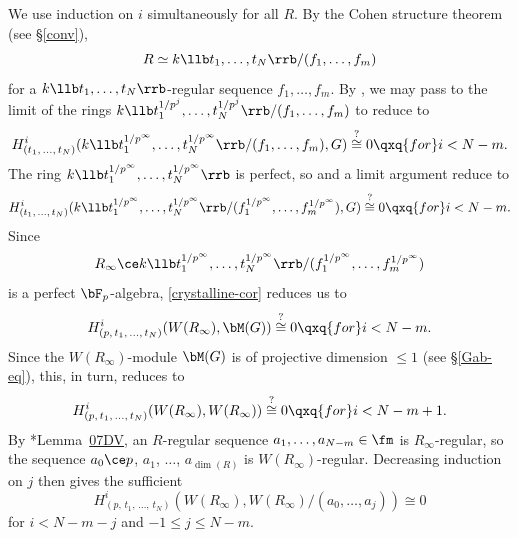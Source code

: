 \bpf
We use induction on $i$ simultaneously for all $R$. By the Cohen structure theorem (see \S\ref{conv}),
\[
R \simeq k\llb t_1, \dotsc, t_N \rrb/(f_1, \dotsc, f_m)
\]
for a $k\llb t_1, \dotsc, t_N \rrb$-regular sequence $f_1, \dotsc, f_m$. By , %
we may pass to the limit of the rings $k\llb t_1^{1/p^j}, \dotsc, t_N^{1/p^j} \rrb/(f_1, \dotsc, f_m)$ %
to reduce to
\[
H^i_{(t_1,\, \dotsc,\, t_N)}(k\llb t_1^{1/p^{\infty}}, \dotsc, t_N^{1/p^{\infty}} \rrb/(f_1, \dotsc, f_m), G) \overset{?}{\cong} 0 \qxq{for} i < N - m.
\]
The ring $k\llb t_1^{1/p^\infty}, \dotsc, t_N^{1/p^\infty} \rrb$ is perfect, so %
 and a limit argument reduce to
\[%
\source{purity-flat-cohomology}
H^i_{(t_1,\, \dotsc,\, t_N)}(k\llb t_1^{1/p^{\infty}}, \dotsc, t_N^{1/p^{\infty}} \rrb/(f_1^{1/p^{\infty}}, \dotsc, f_m^{1/p^{\infty}}), G) \overset{?}{\cong} 0 \qxq{for} i < N - m.
\]%
Since
\[
R_\infty \ce k\llb t_1^{1/p^{\infty}}, \dotsc, t_N^{1/p^{\infty}} \rrb/(f_1^{1/p^{\infty}}, \dotsc, f_m^{1/p^{\infty}})
\]
is a perfect $\bF_p$-algebra, \eqref{crystalline-cor} reduces us to
\[
H^i_{(p,\, t_1,\, \dotsc,\, t_N)}(W(R_\infty), \bM(G)) \overset{?}{\cong} 0 \qxq{for} i < N - m.
\]
Since the $W(R_\infty)$-module $\bM(G)$ is of projective dimension $\le 1$ (see \S\ref{Gab-eq}), this, in turn, reduces to
\[
H^i_{(p,\, t_1,\, \dotsc,\, t_N)}(W(R_\infty), W(R_\infty)) \overset{?}{\cong} 0 \qxq{for} i < N - m + 1. %
\]
By \cite{SP}*{Lemma~\href{https://stacks.math.columbia.edu/tag/07DV}{07DV}}, an $R$-regular sequence $a_1, \dotsc, a_{N - m} \in \fm$ is $R_\infty$-regular, so the sequence $a_0 \ce p$, $a_1$, $\dotsc$, $a_{\dim(R)}$ is $W(R_\infty)$-regular. Decreasing induction on $j$ then gives the sufficient
\[
H^i_{(p,\, t_1,\, \dotsc,\, t_N)}(W(R_\infty), W(R_\infty)/(a_0, \dotsc, a_j)) \cong 0
\]
for $i < N - m - j$ and $-1 \le j \le N - m$.
\epf










